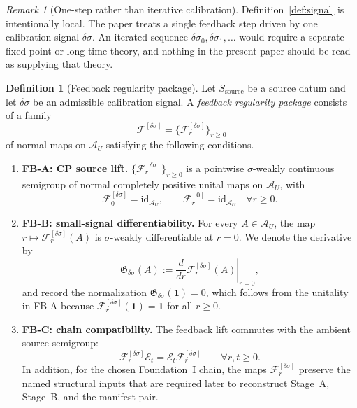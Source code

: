 \documentclass[12pt]{article}
\theoremstyle{definition}
\newtheorem{definition}[theorem]{Definition}
\theoremstyle{remark}
\newtheorem{remark}[theorem]{Remark}
\begin{document}
\begin{remark}[One-step rather than iterative calibration]
Definition~\ref{def:signal} is intentionally local. The paper treats a
single feedback step driven by one calibration signal
\(\delta\sigma\). An iterated sequence
\(\delta\sigma_0,\delta\sigma_1,\dots\) would require a separate fixed
point or long-time theory, and nothing in the present paper should be
read as supplying that theory.
\end{remark}

\begin{definition}[Feedback regularity package]\label{def:FB}
Let \(S_{\mathrm{source}}\) be a source datum and let
\(\delta\sigma\) be an admissible calibration signal. A
\emph{feedback regularity package} consists of a family
\[
\mathscr F^{[\delta\sigma]}
=
\{\mathscr F_r^{[\delta\sigma]}\}_{r\ge0}
\]
of normal maps on \(\mathcal A_U\) satisfying the following conditions.
\begin{enumerate}
\item \textbf{FB-A: CP source lift.}
  \(\{\mathscr F_r^{[\delta\sigma]}\}_{r\ge0}\) is a pointwise
  \(\sigma\)-weakly continuous semigroup of normal completely positive
  unital maps on \(\mathcal A_U\), with
  \[
  \mathscr F_0^{[\delta\sigma]}=\mathrm{id}_{\mathcal A_U},
  \qquad
  \mathscr F_r^{[0]}=\mathrm{id}_{\mathcal A_U}
  \quad
  \forall r\ge0.
  \]
\item \textbf{FB-B: small-signal differentiability.}
  For every \(A\in\mathcal A_U\), the map
  \(r\mapsto \mathscr F_r^{[\delta\sigma]}(A)\) is
  \(\sigma\)-weakly differentiable at \(r=0\). We denote the
  derivative by
  \[
  \mathfrak G_{\delta\sigma}(A)
  :=
  \left.
  \frac{d}{dr}\mathscr F_r^{[\delta\sigma]}(A)
  \right|_{r=0},
  \]
  and record the normalization
  \(\mathfrak G_{\delta\sigma}(\mathbf 1)=0\), which follows from the
  unitality in FB-A because
  \(\mathscr F_r^{[\delta\sigma]}(\mathbf 1)=\mathbf 1\) for all
  \(r\ge0\).
\item \textbf{FB-C: chain compatibility.}
  The feedback lift commutes with the ambient source semigroup:
  \[
  \mathscr F_r^{[\delta\sigma]}\mathcal E_t
  =
  \mathcal E_t\mathscr F_r^{[\delta\sigma]}
  \qquad
  \forall r,t\ge0.
  \]
  In addition, for the chosen Foundation~I chain, the maps
  \(\mathscr F_r^{[\delta\sigma]}\) preserve the named structural inputs
  that are required later to reconstruct Stage~A, Stage~B, and the
  manifest pair.
\end{enumerate}
\end{definition}
\end{document}
